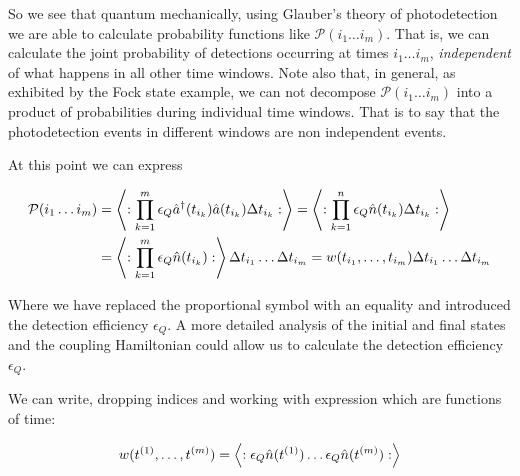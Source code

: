 \documentclass[12pt]{article}
\newcommand{\ep}{\epsilon}
\begin{document}
So we see that quantum mechanically, using Glauber's theory of photodetection we are able to calculate probability functions like $\mathcal{P}(i_1\ldots i_m)$. That is, we can calculate the joint probability of detections occurring at times $i_1 \ldots i_m$, \textit{independent} of what happens in all other time windows. Note also that, in general, as exhibited by the Fock state example, we can not decompose $\mathcal{P}(i_1 \ldots i_m)$ into a product of probabilities during individual time windows. That is to say that the photodetection events in different windows are non independent events.

At this point we can express

\begin{align}
\mathcal{P}(i_1 \ldots i_m) &= \Braket{:\prod_{k=1}^m \ep_Q \hat{a}^{\dag}(t_{i_k})\hat{a}(t_{i_k})\Delta t_{i_k} :} = \Braket{:\prod_{k=1}^n \ep_Q \hat{n}(t_{i_k})\Delta t_{i_k} :}\\
&= \Braket{:\prod_{k=1}^m \ep_Q \hat{n}(t_{i_k}):} \Delta t_{i_1} \ldots \Delta t_{i_m} = w(t_{i_1},\ldots ,t_{i_m}) \Delta t_{i_1} \ldots \Delta t_{i_m}
\end{align}

Where we have replaced the proportional symbol with an equality and introduced the detection efficiency $\ep_Q$. A more detailed analysis of the initial and final states and the coupling Hamiltonian could allow us to calculate the detection efficiency $\ep_Q$.

We can write, dropping indices and working with expression which are functions of time:

\begin{align}
w(t^{(1)},\ldots,t^{(m)}) = \Braket{:\ep_Q\hat{n}(t^{(1)}) \ldots \ep_Q \hat{n}(t^{(m)}) :}
\end{align}

\printbibliography
\end{document}
